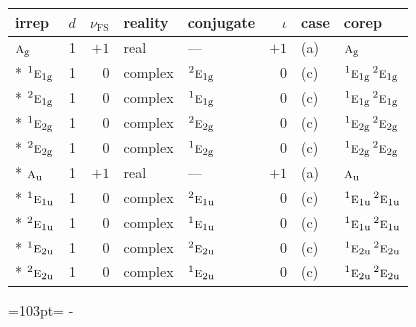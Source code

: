 \documentclass[10pt,a4paper]{article}
\newcommand{\needspace}[1]{\par\penalty-100\begingroup\dimen0=#1\relax\dimen2=\pagegoal
  \advance\dimen2-\pagetotal\ifdim\dimen0>\dimen2\relax\ifdim\dimen2>0pt\vfil\break\fi\fi
  \endgroup}
\numberwithin{equation}{section}
\newcommand{\irr}[1]{\text{\normalfont\scshape #1}}
\newcommand{\conjpair}[1]{{}^{#1}}
\newcommand{\ptag}[1]{\mathrm{#1}}
\newcommand{\fsind}{\nu_{\mathrm{FS}}}
\begin{document}
{\small\renewcommand{\arraystretch}{1.25}\setlength{\tabcolsep}{4pt}\begin{longtable}{@{}lrrllrll@{}}\toprule
irrep & $d$ & $\fsind$ & reality & conjugate & $\iota$ & case & corep\\\midrule\endhead
\bottomrule\endfoot\endlastfoot
$\irr{a}_{\ptag{g}}$ & 1 & $+1$ & real & --- & $+1$ & (a) & $\irr{a}_{\ptag{g}}$\\*
$\conjpair{1}\irr{e}_{1\ptag{g}}$ & 1 & $0$ & complex & $\conjpair{2}\irr{e}_{1\ptag{g}}$ & $0$ & (c) & $\conjpair{1}\irr{e}_{1\ptag{g}}\,\conjpair{2}\irr{e}_{1\ptag{g}}$\\*
$\conjpair{2}\irr{e}_{1\ptag{g}}$ & 1 & $0$ & complex & $\conjpair{1}\irr{e}_{1\ptag{g}}$ & $0$ & (c) & $\conjpair{1}\irr{e}_{1\ptag{g}}\,\conjpair{2}\irr{e}_{1\ptag{g}}$\\*
$\conjpair{1}\irr{e}_{2\ptag{g}}$ & 1 & $0$ & complex & $\conjpair{2}\irr{e}_{2\ptag{g}}$ & $0$ & (c) & $\conjpair{1}\irr{e}_{2\ptag{g}}\,\conjpair{2}\irr{e}_{2\ptag{g}}$\\*
$\conjpair{2}\irr{e}_{2\ptag{g}}$ & 1 & $0$ & complex & $\conjpair{1}\irr{e}_{2\ptag{g}}$ & $0$ & (c) & $\conjpair{1}\irr{e}_{2\ptag{g}}\,\conjpair{2}\irr{e}_{2\ptag{g}}$\\*
$\irr{a}_{\ptag{u}}$ & 1 & $+1$ & real & --- & $+1$ & (a) & $\irr{a}_{\ptag{u}}$\\*
$\conjpair{1}\irr{e}_{1\ptag{u}}$ & 1 & $0$ & complex & $\conjpair{2}\irr{e}_{1\ptag{u}}$ & $0$ & (c) & $\conjpair{1}\irr{e}_{1\ptag{u}}\,\conjpair{2}\irr{e}_{1\ptag{u}}$\\*
$\conjpair{2}\irr{e}_{1\ptag{u}}$ & 1 & $0$ & complex & $\conjpair{1}\irr{e}_{1\ptag{u}}$ & $0$ & (c) & $\conjpair{1}\irr{e}_{1\ptag{u}}\,\conjpair{2}\irr{e}_{1\ptag{u}}$\\*
$\conjpair{1}\irr{e}_{2\ptag{u}}$ & 1 & $0$ & complex & $\conjpair{2}\irr{e}_{2\ptag{u}}$ & $0$ & (c) & $\conjpair{1}\irr{e}_{2\ptag{u}}\,\conjpair{2}\irr{e}_{2\ptag{u}}$\\*
$\conjpair{2}\irr{e}_{2\ptag{u}}$ & 1 & $0$ & complex & $\conjpair{1}\irr{e}_{2\ptag{u}}$ & $0$ & (c) & $\conjpair{1}\irr{e}_{2\ptag{u}}\,\conjpair{2}\irr{e}_{2\ptag{u}}$\\
\bottomrule\end{longtable}}
\needspace{103pt}
\end{document}

